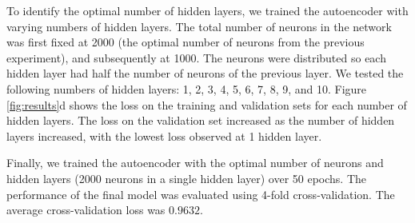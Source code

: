 \vspace{0.2cm}

To identify the optimal number of hidden layers, we trained the autoencoder with varying
numbers of hidden layers. The total number of neurons in the network was first fixed at
2000 (the optimal number of neurons from the previous experiment), and subsequently at
1000. The neurons were distributed so each hidden layer had half the number of neurons
of the previous layer. We tested the following numbers of hidden layers: 1, 2, 3, 4, 5, 6,
7, 8, 9, and 10. Figure \ref{fig:results}d shows the loss on the training and validation
sets for each number of hidden layers. The loss on the validation set increased as the
number of hidden layers increased, with the lowest loss observed at 1 hidden layer.

\vspace{0.2cm}

Finally, we trained the autoencoder with the optimal number of neurons and hidden layers
(2000 neurons in a single hidden layer) over 50 epochs. The performance of the final model
was evaluated using 4-fold cross-validation. The average cross-validation loss was
$0.9632$.
